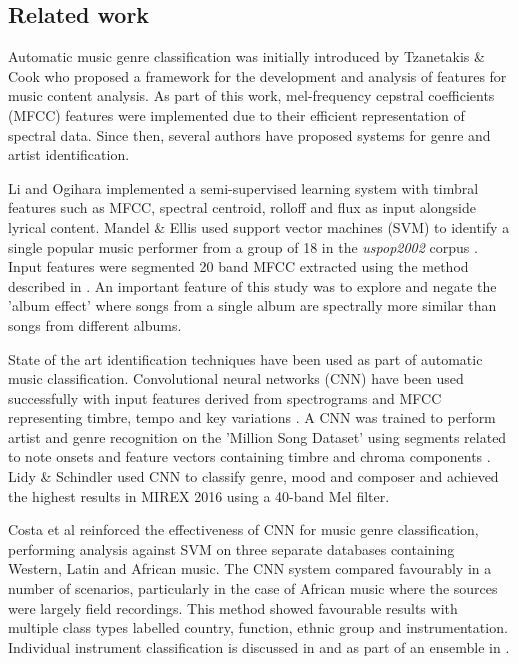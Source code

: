 \documentclass{article}
\begin{document}
{\subsection{Related work} \label{sec: Related Work}

 


Automatic music genre classification was initially introduced by Tzanetakis \& Cook \cite{tzanetakis_musical_2002} who proposed a framework for the development and analysis of features for music content analysis. As part of this work, mel-frequency cepstral coefficients (MFCC) features \cite{logan_mel_2000} were implemented due to their efficient representation of spectral data. Since then, several authors have proposed systems for genre and artist identification. 

Li and Ogihara \cite{li_music_2004} implemented a semi-supervised learning system with timbral features such as MFCC, spectral centroid, rolloff and flux as input alongside lyrical content.  Mandel \& Ellis \cite{mandel_song-level_2005} used support vector machines (SVM) to identify a single popular music performer from a group of 18 in the \emph{uspop2002} corpus \cite{berenzweig_large-scale_2004,ellis_d._uspop2002_2003}. Input features were segmented 20 band  MFCC extracted using the method described in \cite{pachet_improving_2004}. An important feature of this study was to explore and negate the 'album effect' \cite{kim_towards_2006,whitman_artist_2001} where songs from a single album are spectrally more similar than songs from different albums. 

State of the art identification techniques have been used as part of automatic music classification. Convolutional neural networks (CNN) have been used successfully with input features derived from spectrograms \cite{lee_unsupervised_2009} and MFCC representing timbre, tempo and key variations \cite{li_automatic_2010}. A CNN was trained to perform artist and genre recognition on the 'Million Song Dataset' \cite{bertin-mahieux_million_2011} using segments related to note onsets and feature vectors containing timbre and chroma components \cite{dieleman_audio-based_2011}. Lidy \& Schindler \cite{lidy_parallel_2016} used CNN to classify genre, mood and composer and achieved the highest results in MIREX 2016 using a 40-band Mel filter.

Costa et al \cite{costa_evaluation_2017} reinforced the effectiveness of CNN for music genre classification, performing analysis against SVM on three separate databases containing Western, Latin and African music. The CNN system compared favourably in a number of scenarios, particularly in the case of African music where the sources were largely field recordings. This method showed favourable results with multiple class types labelled country, function, ethnic group and instrumentation. Individual instrument classification is discussed in \cite{park_musical_2015} and as part of an ensemble in \cite{han_deep_2017}.

}
\end{document}
